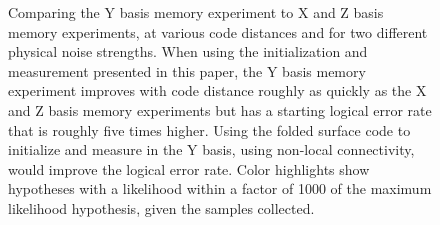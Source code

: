 \documentclass[onecolumn,unpublished,a4paper]{quantumarticle}
\theoremstyle{definition}
\theoremstyle{definition}
\theoremstyle{definition}
\begin{document}
\begin{figure}
    \centering
    \caption{
        Comparing the Y basis memory experiment to X and Z basis memory experiments, at various code distances and for two different physical noise strengths.
        When using the initialization and measurement presented in this paper, the Y basis memory experiment improves with code distance roughly as quickly as the X and Z basis memory experiments but has a starting logical error rate that is roughly five times higher.
        Using the folded surface code to initialize and measure in the Y basis, using non-local connectivity, would improve the logical error rate.
        Color highlights show hypotheses with a likelihood within a factor of 1000 of the maximum likelihood hypothesis, given the samples collected.
    }
    \label{fig:error_rate}
\end{figure}
\end{document}
